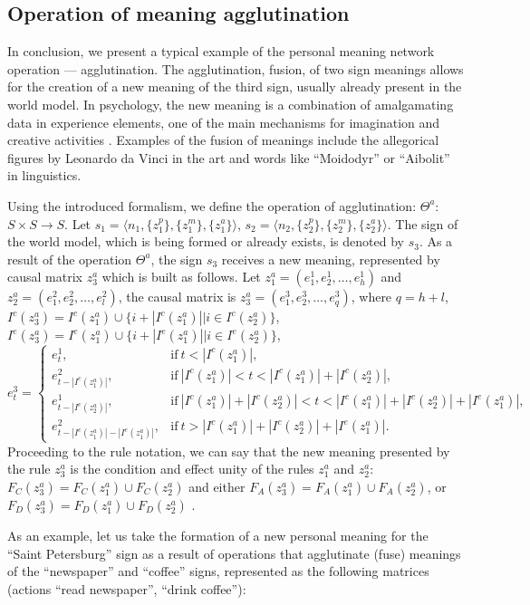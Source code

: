 \documentclass[review]{elsarticle}
\begin{document}
\subsection{Operation of meaning agglutination}
In conclusion, we present a typical example of the personal meaning network operation --- agglutination. The agglutination, fusion, of two sign meanings allows for the creation of a new meaning of the third sign, usually already present in the world model. In psychology, the new meaning is a combination of amalgamating data in experience elements, one of the main mechanisms for imagination and creative activities \cite{Asmolov1990}. Examples of the fusion of meanings include the allegorical figures by Leonardo da Vinci in the art and words like ``Moidodyr'' or ``Aibolit'' in linguistics.

Using the introduced formalism, we define the operation of agglutination: $\Theta^a$: $S\times S\rightarrow S$. Let $s_1=\langle n_1, \{z_1^p\}, \{z_1^m\}, \{z_1^a\} \rangle$, $s_2=\langle n_2, \{z_2^p\}, \{z_2^m\}, \{z_2^a\} \rangle$. The sign of the world model, which is being formed or already exists, is denoted by $s_3$. As a result of the operation $\Theta^a$, the sign $s_3$ receives a new meaning, represented by causal matrix $z_3^a$ which is built as follows. Let $z_1^a=(e_1^1, e_2^1,\dots,e_h^1)$ and $z_2^a=(e_1^2, e_2^2,\dots,e_l^2)$, the causal matrix is $z_3^a=(e_1^3, e_2^3,\dots,e_q^3)$, where $q=h+l$, $I^c(z_3^a)=I^c(z_1^a)\cup \{i+|I^c(z_1^a)||i\in I^c(z_2^a)\}$, $I^e(z_3^a)=I^e(z_1^a)\cup \{i+|I^e(z_1^a)||i\in I^e(z_2^a)\}$,
\[
e_t^3=\begin{cases}
e_t^1, &\text{if}\ t<|I^c(z_1^a)|,\\
e_{t-|I^c(z_1^a)|}^2, &\text{if}\ |I^c(z_1^a)|<t<|I^c(z_1^a)|+|I^c(z_2^a)|,\\
e_{t-|I^c(z_2^a)|}^1, &\text{if}\ |I^c(z_1^a)|+|I^c(z_2^a)|<t<|I^c(z_1^a)|+|I^c(z_2^a)|+|I^e(z_1^a)|,\\
e_{t-|I^c(z_1^a)|-|I^e(z_1^a)|}^2, &\text{if}\ t>|I^c(z_1^a)|+|I^c(z_2^a)|+|I^e(z_1^a)|.
\end{cases}
\]
Proceeding to the rule notation, we can say that the new meaning presented by the rule $z_3^a$ is the condition and effect unity of the rules $z_1^a$ and $z_2^a$: $F_C(z_3^a)=F_C(z_1^a)\cup F_C(z_2^a)$ and either $F_A(z_3^a)=F_A(z_1^a)\cup F_A(z_2^a)$, or $F_D(z_3^a)=F_D(z_1^a)\cup F_D(z_2^a)$ \cite{Osipov2016a}.

As an example, let us take the formation of a new personal meaning for the ``Saint Petersburg'' sign as a result of operations that  agglutinate (fuse) meanings of the ``newspaper'' and ``coffee'' signs, represented as the following matrices (actions ``read newspaper'', ``drink coffee''):
\end{document}
